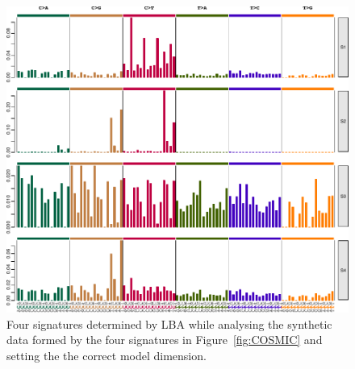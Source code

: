 \documentclass[11pt]{amsart}
\theoremstyle{definition}
\begin{document}
\begin{center}
\begin{figure}
  \includegraphics[width=16cm]{sfigs/Signature_Ale_plot_bcr1} 
  \caption{Four signatures determined by LBA while
  analysing the synthetic data formed by the four signatures in
  Figure~\ref{fig:COSMIC} and setting the the correct model
  dimension.}\label{fig:LBA} 
\end{figure}
\end{center}
\end{document}
